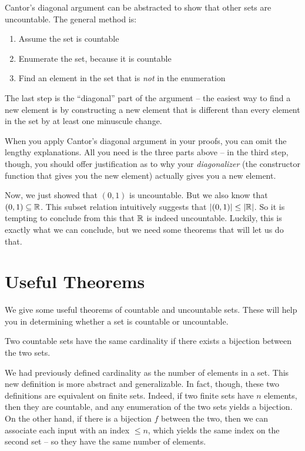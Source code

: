 \documentclass[main.tex]{subfiles}
\begin{document}
\begin{rem}
	Cantor's diagonal argument can be abstracted to show that other sets are uncountable. The general method is:
	\begin{enumerate}
		\item Assume the set is countable
		\item Enumerate the set, because it is countable
		\item Find an element in the set that is \textit{not} in the enumeration
	\end{enumerate}
	The last step is the ``diagonal'' part of the argument -- the easiest way to find a new element is by constructing a new element that is different than every element in the set by at least one minuscule change.
\end{rem}

\begin{rem}
	When you apply Cantor's diagonal argument in your proofs, you can omit the lengthy explanations. All you need is the three parts above -- in the third step, though, you should offer justification as to why your \textit{diagonalizer} (the constructor function that gives you the new element) actually gives you a new element.
\end{rem}

Now, we just showed that \((0,1)\) is uncountable. But we also know that \((0,1) \subseteq \mathbb{R}\). This subset relation intuitively suggests that \(|(0,1)| \leq |\mathbb{R}|\). So it is tempting to conclude from this that \(\mathbb{R}\) is indeed uncountable. Luckily, this is exactly what we can conclude, but we need some theorems that will let us do that.

\section{Useful Theorems}

We give some useful theorems of countable and uncountable sets. These will help you in determining whether a set is countable or uncountable.

\begin{defn}[Cardinality]
	Two countable sets have the same cardinality if there exists a bijection between the two sets.
\end{defn}

\begin{rem}
	We had previously defined cardinality as the number of elements in a set. This new definition is more abstract and generalizable. In fact, though, these two definitions are equivalent on finite sets. Indeed, if two finite sets have \(n\) elements, then they are countable, and any enumeration of the two sets yields a bijection. On the other hand, if there is a bijection \(f\) between the two, then we can associate each input with an index \(\leq n\), which yields the same index on the second set -- so they have the same number of elements.
\end{rem}
\end{document}
